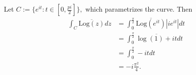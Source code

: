 \documentclass{article}
\begin{document}
\section{} %
Let $C:=\{e^{it}: t \in \left[0,\frac{pi}{2}\right]\},$ which parametrizes the curve. Then 
\begin{align*}
\int_C \overline{\text{Log}(z)} dz &= \int_{0}^{\frac{\pi}{2}}\overline{\text{Log}(e^{it})} |ie^{it}|dt\\
	&=\int_{0}^{\frac{\pi}{2}}\overline{\log(1)+it}dt\\
	&=\int_{0}^{\frac{\pi}{2}}-it dt\\
	&= -i \frac{\pi^2}{4}.
\end{align*}

\section{} %
\section{} %
\section{} %
\section{} %
\end{document}
